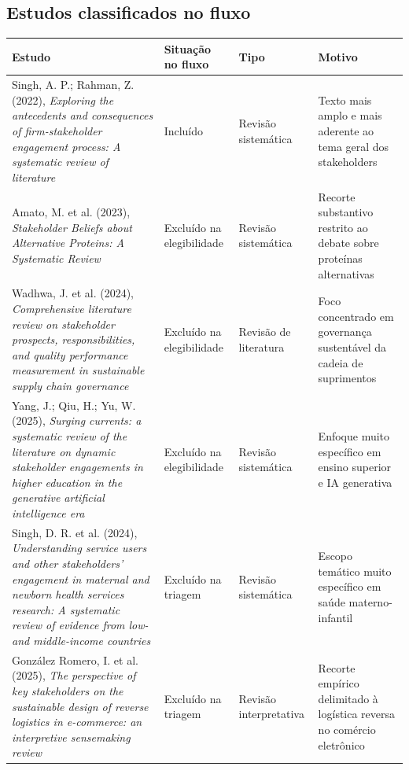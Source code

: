 \documentclass[12pt]{article}
\begin{document}
\subsection{Estudos classificados no fluxo}
\label{sec:orgbd1f9b0}

\begin{table}[htbp]
\centering
\scriptsize
\setlength{\tabcolsep}{3pt}
\renewcommand{\arraystretch}{1.15}
\begin{tabularx}{\textwidth}{>{\raggedright\arraybackslash}X >{\raggedright\arraybackslash}m{} >{\raggedright\arraybackslash}m{} >{\raggedright\arraybackslash}m{}}
\toprule
Estudo & Situação no fluxo & Tipo & Motivo \\
\midrule
Singh, A. P.; Rahman, Z. (2022), \textit{Exploring the antecedents and consequences of firm-stakeholder engagement process: A systematic review of literature} & Incluído & Revisão sistemática & Texto mais amplo e mais aderente ao tema geral dos stakeholders \\
Amato, M. et al. (2023), \textit{Stakeholder Beliefs about Alternative Proteins: A Systematic Review} & Excluído na elegibilidade & Revisão sistemática & Recorte substantivo restrito ao debate sobre proteínas alternativas \\
Wadhwa, J. et al. (2024), \textit{Comprehensive literature review on stakeholder prospects, responsibilities, and quality performance measurement in sustainable supply chain governance} & Excluído na elegibilidade & Revisão de literatura & Foco concentrado em governança sustentável da cadeia de suprimentos \\
Yang, J.; Qiu, H.; Yu, W. (2025), \textit{Surging currents: a systematic review of the literature on dynamic stakeholder engagements in higher education in the generative artificial intelligence era} & Excluído na elegibilidade & Revisão sistemática & Enfoque muito específico em ensino superior e IA generativa \\
Singh, D. R. et al. (2024), \textit{Understanding service users and other stakeholders' engagement in maternal and newborn health services research: A systematic review of evidence from low- and middle-income countries} & Excluído na triagem & Revisão sistemática & Escopo temático muito específico em saúde materno-infantil \\
González Romero, I. et al. (2025), \textit{The perspective of key stakeholders on the sustainable design of reverse logistics in e-commerce: an interpretive sensemaking review} & Excluído na triagem & Revisão interpretativa & Recorte empírico delimitado à logística reversa no comércio eletrônico \\
\bottomrule
\end{tabularx}
\normalsize
\end{table}
\end{document}
